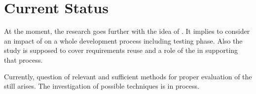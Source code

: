 \section{Current Status}
At the moment, the research goes further with the idea of \cbc. It implies to consider an impact of \cc on a whole development process including testing phase. Also the study is supposed to cover requirements reuse and a role of the \cbc in supporting that process.

Currently, question of relevant and sufficient methods for proper evaluation of the \cbc still arises. The investigation of possible techniques is in process.





%
